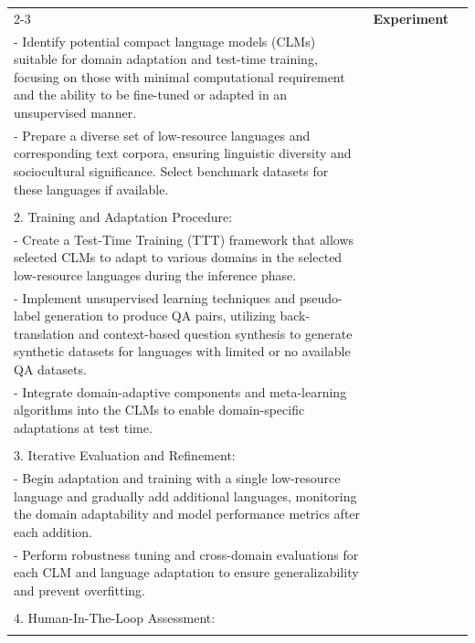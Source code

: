 \begin{center}
\begin{longtable}{p{}p{}p{}}
{} \\
\cline{2-3}
& \multicolumn{1}{p{.08\textwidth}}{\textbf{Experiment}} & 
\makecell{ 
    \multicolumn{1}{p{.75\textwidth}}{1. Selection and Preparation:} \\
    \multicolumn{1}{p{.75\textwidth}}{- Identify potential compact language models (CLMs) suitable for domain adaptation and test-time training, focusing on those with minimal computational requirement and the ability to be fine-tuned or adapted in an unsupervised manner.} \\
    \multicolumn{1}{p{.75\textwidth}}{- Prepare a diverse set of low-resource languages and corresponding text corpora, ensuring linguistic diversity and sociocultural significance. Select benchmark datasets for these languages if available.} \\ \\
    \multicolumn{1}{p{.75\textwidth}}{2. Training and Adaptation Procedure:} \\
    \multicolumn{1}{p{.75\textwidth}}{- Create a Test-Time Training (TTT) framework that allows selected CLMs to adapt to various domains in the selected low-resource languages during the inference phase.} \\
    \multicolumn{1}{p{.75\textwidth}}{- Implement unsupervised learning techniques and pseudo-label generation to produce QA pairs, utilizing back-translation and context-based question synthesis to generate synthetic datasets for languages with limited or no available QA datasets.} \\
    \multicolumn{1}{p{.75\textwidth}}{- Integrate domain-adaptive components and meta-learning algorithms into the CLMs to enable domain-specific adaptations at test time.
} \\ \\
    \multicolumn{1}{p{.75\textwidth}}{3. Iterative Evaluation and Refinement:} \\
    \multicolumn{1}{p{.75\textwidth}}{- Begin adaptation and training with a single low-resource language and gradually add additional languages, monitoring the domain adaptability and model performance metrics after each addition.} \\ 
    \multicolumn{1}{p{.75\textwidth}}{- Perform robustness tuning and cross-domain evaluations for each CLM and language adaptation to ensure generalizability and prevent overfitting.} \\ \\
    \multicolumn{1}{p{.75\textwidth}}{4. Human-In-The-Loop Assessment:} \\
}
\end{longtable}
\end{center}
